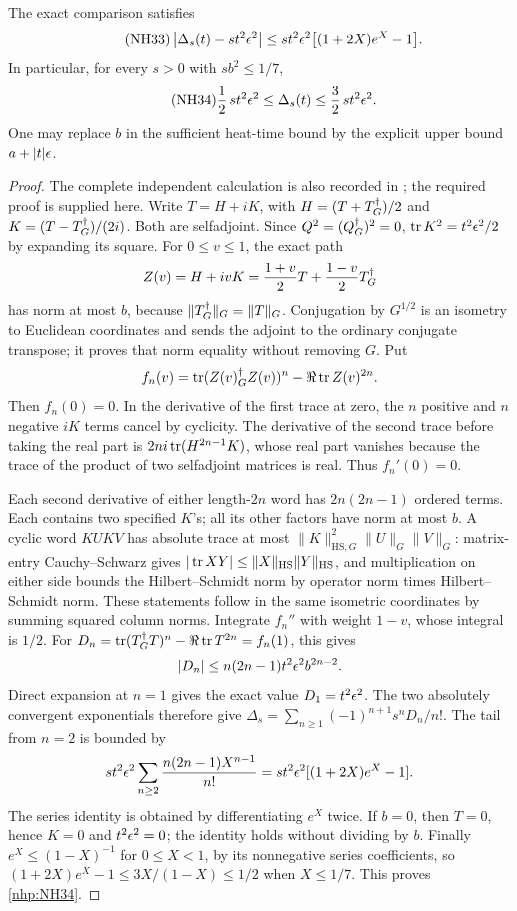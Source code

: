 \begin{nhptheorem}
The exact comparison satisfies
\begin{equation}\tag{NH33}\label{nhp:NH33}
\left|\Delta_s(t)-st^2\epsilon^2\right|
\le st^2\epsilon^2\bigl[(1+2X)e^X-1\bigr].
\end{equation}
In particular, for every \(s>0\) with \(sb^2\le1/7\),
\begin{equation}\tag{NH34}\label{nhp:NH34}
\frac12\,st^2\epsilon^2\le\Delta_s(t)
\le\frac32\,st^2\epsilon^2 .
\end{equation}
One may replace \(b\) in the sufficient heat-time bound
by the explicit upper bound \(a+|t|\epsilon\).
\end{nhptheorem}
\begin{proof}
The complete independent calculation is also recorded
in \cite{nhp:MetricHeat}; the required proof is supplied here.
Write \(T=H+iK\), with
\(H=(T+T^\dagger_G)/2\) and \(K=(T-T^\dagger_G)/(2i)\).
Both are selfadjoint. Since \(Q^2=(Q^\dagger_G)^2=0\),
\(\operatorname{tr} K^2=t^2\epsilon^2/2\) by expanding its square.
For \(0\le v\le1\), the exact path
\[
Z(v)=H+ivK=\frac{1+v}{2}T+\frac{1-v}{2}T^\dagger_G
\]
has norm at most \(b\), because \(\|T^\dagger_G\|_G=\|T\|_G\).
Conjugation by \(G^{1/2}\) is an isometry to Euclidean
coordinates and sends the adjoint to the ordinary
conjugate transpose; it proves that norm equality
without removing \(G\).
Put
\[
f_n(v)=\operatorname{tr}(Z(v)^\dagger_G Z(v))^n-\Re\operatorname{tr} Z(v)^{2n}.
\]
Then \(f_n(0)=0\). In the derivative of the first
trace at zero, the \(n\) positive and \(n\) negative
\(iK\) terms cancel by cyclicity. The derivative of the
second trace before taking the real part is
\(2ni\operatorname{tr}(H^{2n-1}K)\), whose real part vanishes because
the trace of the product of two selfadjoint matrices
is real. Thus \(f_n'(0)=0\).

Each second derivative of either length-\(2n\) word
has \(2n(2n-1)\) ordered terms. Each contains two
specified \(K\)'s; all its other factors have norm at
most \(b\). A cyclic word \(KUKV\) has absolute trace
at most \(\|K\|_{\mathrm{HS},G}^2\|U\|_G\|V\|_G\):
matrix-entry Cauchy--Schwarz gives
\(|\operatorname{tr} XY|\le\|X\|_{\mathrm{HS}}\|Y\|_{\mathrm{HS}}\),
and multiplication on either side bounds the
Hilbert--Schmidt norm by operator norm times
Hilbert--Schmidt norm. These statements follow in the
same isometric coordinates by summing squared column
norms. Integrate \(f_n''\) with weight \(1-v\),
whose integral is \(1/2\). For
\(D_n=\operatorname{tr}(T^\dagger_G T)^n-\Re\operatorname{tr} T^{2n}=f_n(1)\), this gives
\[
|D_n|\le n(2n-1)t^2\epsilon^2 b^{2n-2}.
\]
Direct expansion at \(n=1\) gives the exact value
\(D_1=t^2\epsilon^2\).
The two absolutely convergent exponentials therefore give
\(\Delta_s=\sum_{n\ge1}(-1)^{n+1}s^nD_n/n!\).
The tail from \(n=2\) is bounded by
\[
st^2\epsilon^2
\sum_{n\ge2}\frac{n(2n-1)X^{n-1}}{n!}
=st^2\epsilon^2[(1+2X)e^X-1].
\]
The series identity is obtained by differentiating
\(e^X\) twice. If \(b=0\), then \(T=0\), hence
\(K=0\) and \(t^2\epsilon^2=0\); the identity holds without
dividing by \(b\). Finally \(e^X\le(1-X)^{-1}\) for
\(0\le X<1\), by its nonnegative series coefficients,
so \((1+2X)e^X-1\le3X/(1-X)\le1/2\) when
\(X\le1/7\). This proves \eqref{nhp:NH34}.
\end{proof}

